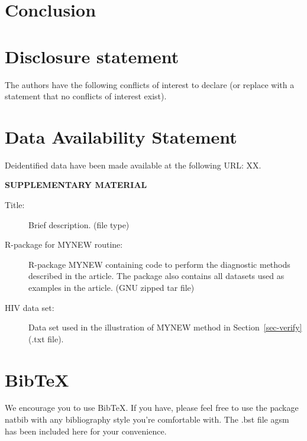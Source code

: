 \documentclass[
  12pt]{article}
\begin{document}
\addtolength{\textheight}{-.2in}%

\section{Conclusion}\label{sec-conc}

\section{Disclosure statement}\label{disclosure-statement}

The authors have the following conflicts of interest to declare (or
replace with a statement that no conflicts of interest exist).

\section{Data Availability Statement}\label{data-availability-statement}

Deidentified data have been made available at the following URL: XX.

\label{supplementary-material}
\bigskip

\begin{center}

{\large\bf SUPPLEMENTARY MATERIAL}

\end{center}

\begin{description}
\item[Title:]
Brief description. (file type)
\item[R-package for MYNEW routine:]
R-package MYNEW containing code to perform the diagnostic methods
described in the article. The package also contains all datasets used as
examples in the article. (GNU zipped tar file)
\item[HIV data set:]
Data set used in the illustration of MYNEW method in
Section~\ref{sec-verify} (.txt file).
\end{description}

\section{BibTeX}\label{bibtex}

We encourage you to use BibTeX. If you have, please feel free to use the
package natbib with any bibliography style you're comfortable with. The
.bst file agsm has been included here for your convenience. 


  
\end{document}
